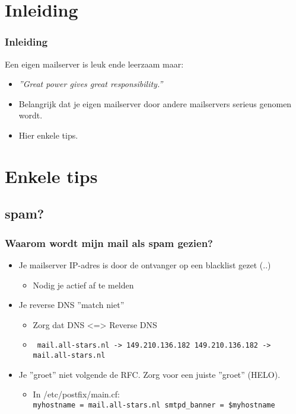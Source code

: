\section{Inleiding}

\begin{frame}
	\frametitle{Inleiding}
Een eigen mailserver is leuk ende leerzaam maar:
\begin{itemize}
\pause
\item {\it ''Great power gives great responsibility.''}
\pause
\item Belangrijk dat je eigen mailserver door andere mailservers serieus genomen wordt.\\
\pause
\item Hier enkele tips.
\end{itemize}
\end{frame}

\section{Enkele tips}
\subsection{spam?}
\begin{frame}
	\frametitle{Waarom wordt mijn mail als spam gezien?}
\begin{itemize}
\pause
\item Je mailserver IP-adres is door de ontvanger op een blacklist gezet (..)
	\pause
	\begin{itemize}
	  \item Nodig je actief af te melden
	\end{itemize}
\pause
\item Je reverse DNS ''match niet''
	\pause
	\begin{itemize}
	  \item Zorg dat DNS <=> Reverse DNS
	  \pause
      \item {\tt
      mail.all-stars.nl -> 149.210.136.182
      149.210.136.182   -> mail.all-stars.nl}
	\end{itemize}
\pause
\item Je ''groet'' niet volgende de RFC. Zorg voor een juiste ''groet'' (HELO).
	\pause
	\begin{itemize}
	\item In /etc/postfix/main.cf:\\
    {\tt	myhostname = mail.all-stars.nl
			smtpd\_banner = \$myhostname}
	\end{itemize}
\end{itemize}
\end{frame}

